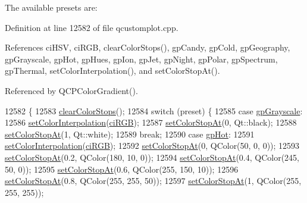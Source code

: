 The available presets are\+:  

Definition at line 12582 of file qcustomplot.\+cpp.



References ci\+H\+S\+V, ci\+R\+G\+B, clear\+Color\+Stops(), gp\+Candy, gp\+Cold, gp\+Geography, gp\+Grayscale, gp\+Hot, gp\+Hues, gp\+Ion, gp\+Jet, gp\+Night, gp\+Polar, gp\+Spectrum, gp\+Thermal, set\+Color\+Interpolation(), and set\+Color\+Stop\+At().



Referenced by Q\+C\+P\+Color\+Gradient().


\begin{DoxyCode}
12582                                                        \{
12583   \hyperlink{class_q_c_p_color_gradient_a939213e85f0d1279519d555c5fcfb6ad}{clearColorStops}();
12584   \textcolor{keywordflow}{switch} (preset) \{
12585   \textcolor{keywordflow}{case} \hyperlink{class_q_c_p_color_gradient_aed6569828fee337023670272910c9072add11ae369a86f3b1b6205ec72e5021fb}{gpGrayscale}:
12586     \hyperlink{class_q_c_p_color_gradient_aa13fda86406e1d896a465a409ae63b38}{setColorInterpolation}(\hyperlink{class_q_c_p_color_gradient_ac5dca17cc24336e6ca176610e7f77fc1a5e30f725c9cfe93999e268a9f92afbe7}{ciRGB});
12587     \hyperlink{class_q_c_p_color_gradient_a3b48be5e78079db1bb2a1188a4c3390e}{setColorStopAt}(0, Qt::black);
12588     \hyperlink{class_q_c_p_color_gradient_a3b48be5e78079db1bb2a1188a4c3390e}{setColorStopAt}(1, Qt::white);
12589     \textcolor{keywordflow}{break};
12590   \textcolor{keywordflow}{case} \hyperlink{class_q_c_p_color_gradient_aed6569828fee337023670272910c9072a4f42e534cf6cff5a29a5388094d099b5}{gpHot}:
12591     \hyperlink{class_q_c_p_color_gradient_aa13fda86406e1d896a465a409ae63b38}{setColorInterpolation}(\hyperlink{class_q_c_p_color_gradient_ac5dca17cc24336e6ca176610e7f77fc1a5e30f725c9cfe93999e268a9f92afbe7}{ciRGB});
12592     \hyperlink{class_q_c_p_color_gradient_a3b48be5e78079db1bb2a1188a4c3390e}{setColorStopAt}(0, QColor(50, 0, 0));
12593     \hyperlink{class_q_c_p_color_gradient_a3b48be5e78079db1bb2a1188a4c3390e}{setColorStopAt}(0.2, QColor(180, 10, 0));
12594     \hyperlink{class_q_c_p_color_gradient_a3b48be5e78079db1bb2a1188a4c3390e}{setColorStopAt}(0.4, QColor(245, 50, 0));
12595     \hyperlink{class_q_c_p_color_gradient_a3b48be5e78079db1bb2a1188a4c3390e}{setColorStopAt}(0.6, QColor(255, 150, 10));
12596     \hyperlink{class_q_c_p_color_gradient_a3b48be5e78079db1bb2a1188a4c3390e}{setColorStopAt}(0.8, QColor(255, 255, 50));
12597     \hyperlink{class_q_c_p_color_gradient_a3b48be5e78079db1bb2a1188a4c3390e}{setColorStopAt}(1, QColor(255, 255, 255));

\end{DoxyCode}
